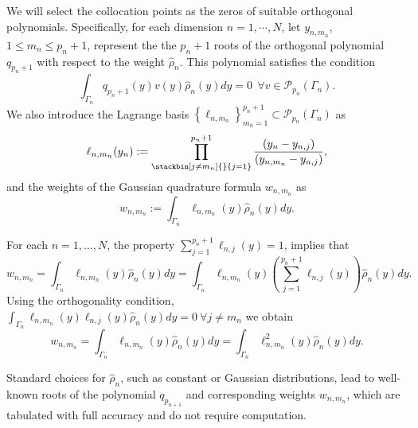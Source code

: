 \documentclass[final,onefignum,onetabnum]{mousaviart}
\begin{document}
	We will select the collocation points as the zeros of suitable orthogonal polynomials. Specifically, for each dimension $n= 1, \cdots, N$, let $y_{n, m_{n}}$, $1 \leq m_n \leq p_n+1$, represent the the $p_n+1$ roots of the orthogonal polynomial $q_{p_n+1}$ with respect to the weight $\hat{\rho}_n$. This polynomial satisfies the condition
	\begin{equation*}
		\int_{\Gamma_n} q_{p_n+1}(y) v(y) \hat{\rho}_n(y) dy = 0 ~~
		\forall v \in \mathcal{P}_{p_{n}}(\Gamma_n).
	\end{equation*}	
	We also introduce the Lagrange basis $\left\lbrace \ell_{n,m_n}\right\rbrace_{m_n=1}^{p_n+1} \subset \mathcal{P}_{p_n}(\Gamma_n)$ as
	\begin{equation*}
		\ell_{n,m_n}(y_n):=\prod_{\stackbin[j\neq m_n]{}{j=1}}^{p_n+1}\frac{(y_n - y_{n,j})}{(y_{n,m_n} - y_{n,j})},
	\end{equation*}
	and the weights of the Gaussian quadrature formula $w_{n, m_n}$ as
	\begin{equation*}
		w_{n,m_n}:= \int_{\Gamma_n} \ell_{n,m_n}(y) \hat{\rho}_n(y)dy.
	\end{equation*}
	
	\vspace*{1mm}
	\begin{remark}
		\label{rem:equivalence-weights}
		For each $n=1,\dots, N$, the property $\sum_{j= 1}^{p_n+1}\ell_{n,j}(y) = 1$, implies that
		\begin{equation*}
			w_{n,m_n}= \int_{\Gamma_n} \ell_{n,m_n}(y) \hat{\rho}_n(y) dy = 
			\int_{\Gamma_n} \ell_{n,m_n}(y) 
			\left( \sum_{j= 1}^{p_n+1}\ell_{n,j}(y) \right)
			\hat{\rho}_n(y) dy.
		\end{equation*}
		Using the orthogonality condition,  $\int_{\Gamma_n}\ell_{n,m_n}(y) \ell_{n,j}(y) \hat{\rho}_n(y) dy =  0 ~ \forall j \neq  m_n$ we obtain
		\begin{equation}
			\label{eq:weights}
			w_{n,m_n}= \int_{\Gamma_n} \ell_{n,m_n}(y) \hat{\rho}_n(y) dy = 
			\int_{\Gamma_n} \ell_{n,m_n}^2(y) \hat{\rho}_n(y) dy.
		\end{equation}
	\end{remark}
	
	\vspace*{1mm}
	Standard choices for $\hat{\rho}_n$, such as constant or Gaussian distributions, lead to well-known roots of the polynomial $q_{p_{n+1}}$ and corresponding weights $w_{n, m_n}$, which are tabulated with full accuracy and do not require computation.
	
\end{document}
